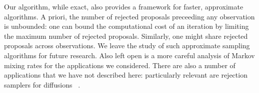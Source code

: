 Our algorithm, while exact, also provides a framework for faster, approximate algorithms.
A priori, the number of rejected proposals preceeding any observation is 
unbounded: one can bound the computational cost of an iteration by limiting the maximum number
of rejected proposals. Similarly, one might share rejected proposals across observations. We leave
the study of such approximate sampling algorithms %
for future research. Also left open is a more careful analysis
of Markov mixing rates for the applications we considered. There are also a
 number of applications that we have
not described here: particularly relevant are rejection samplers for 
diffusions~\citep{beskos06,bladt2014} .

